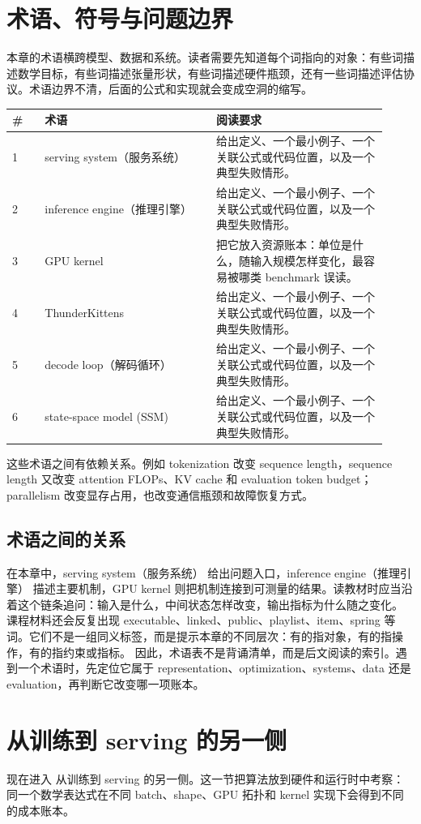 \documentclass[a4paper]{article}
\begin{document}
\section{术语、符号与问题边界}
本章的术语横跨模型、数据和系统。读者需要先知道每个词指向的对象：有些词描述数学目标，有些词描述张量形状，有些词描述硬件瓶颈，还有一些词描述评估协议。术语边界不清，后面的公式和实现就会变成空洞的缩写。
\begin{longtable}{p{0.08\linewidth}p{0.42\linewidth}p{0.42\linewidth}}
\toprule
\textbf{\#} & \textbf{术语} & \textbf{阅读要求}\\
\midrule
1 & serving system（服务系统） & 给出定义、一个最小例子、一个关联公式或代码位置，以及一个典型失败情形。\\
2 & inference engine（推理引擎） & 给出定义、一个最小例子、一个关联公式或代码位置，以及一个典型失败情形。\\
3 & GPU kernel & 把它放入资源账本：单位是什么，随输入规模怎样变化，最容易被哪类 benchmark 误读。\\
4 & ThunderKittens & 给出定义、一个最小例子、一个关联公式或代码位置，以及一个典型失败情形。\\
5 & decode loop（解码循环） & 给出定义、一个最小例子、一个关联公式或代码位置，以及一个典型失败情形。\\
6 & state-space model (SSM) & 给出定义、一个最小例子、一个关联公式或代码位置，以及一个典型失败情形。\\
\bottomrule
\end{longtable}
这些术语之间有依赖关系。例如 tokenization 改变 sequence length，sequence length 又改变 attention FLOPs、KV cache 和 evaluation token budget；parallelism 改变显存占用，也改变通信瓶颈和故障恢复方式。
\subsection{术语之间的关系}
在本章中，serving system（服务系统） 给出问题入口，inference engine（推理引擎） 描述主要机制，GPU kernel 则把机制连接到可测量的结果。读教材时应当沿着这个链条追问：输入是什么，中间状态怎样改变，输出指标为什么随之变化。
课程材料还会反复出现 executable、linked、public、playlist、item、spring 等词。它们不是一组同义标签，而是提示本章的不同层次：有的指对象，有的指操作，有的指约束或指标。
因此，术语表不是背诵清单，而是后文阅读的索引。遇到一个术语时，先定位它属于 representation、optimization、systems、data 还是 evaluation，再判断它改变哪一项账本。
\section{从训练到 serving 的另一侧}
现在进入 从训练到 serving 的另一侧。这一节把算法放到硬件和运行时中考察：同一个数学表达式在不同 batch、shape、GPU 拓扑和 kernel 实现下会得到不同的成本账本。
\end{document}
